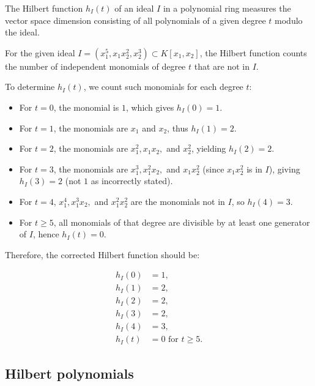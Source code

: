 \documentclass[12pt, a4paper]{article}
\begin{document}
\begin{mdnote}
    The Hilbert function \( h_I(t) \) of an ideal \( I \) in a polynomial ring 
    measures the vector space dimension consisting of all polynomials of a given 
    degree \( t \) modulo the ideal.
\end{mdnote}

\begin{mdexample}
    For the given ideal 
\( I = (x_1^5, x_1x_2^2, x_2^3) \subset K[x_1, x_2] \), the Hilbert function 
counts the number of independent monomials of degree \( t \) that are not in 
\( I \).

To determine \( h_I(t) \), we count such monomials for each degree \( t \):

\begin{itemize}
    \item For \( t = 0 \), the monomial is \( 1 \), which gives \( h_I(0) = 1 \).
    \item For \( t = 1 \), the monomials are \( x_1 \) and \( x_2 \), thus \( h_I(1) = 2 \).
    \item For \( t = 2 \), the monomials are \( x_1^2, x_1x_2, \) and \( x_2^2 \), yielding \( h_I(2) = 2 \).
    \item For \( t = 3 \), the monomials are \( x_1^3, x_1^2x_2, \) and \( x_1x_2^2 \) 
    (since \( x_1x_2^2 \) is in \( I \)), giving \( h_I(3) = 2 \) (not \( 1 \) as incorrectly stated).
    \item For \( t = 4 \), \( x_1^4, x_1^3x_2, \) and \( x_1^2x_2^2 \) are the monomials not in \( I \), 
    so \( h_I(4) = 3 \).
    \item For \( t \geq 5 \), all monomials of that degree are divisible by at least one generator of \( I \), 
    hence \( h_I(t) = 0 \).
\end{itemize}

Therefore, the corrected Hilbert function should be:

\[
\begin{aligned}
h_I(0) &= 1, \\
h_I(1) &= 2, \\
h_I(2) &= 2, \\
h_I(3) &= 2, \\
h_I(4) &= 3, \\
h_I(t) &= 0 \text{ for } t \geq 5.
\end{aligned}
\]
\end{mdexample}



\subsection{Hilbert polynomials}
\end{document}
